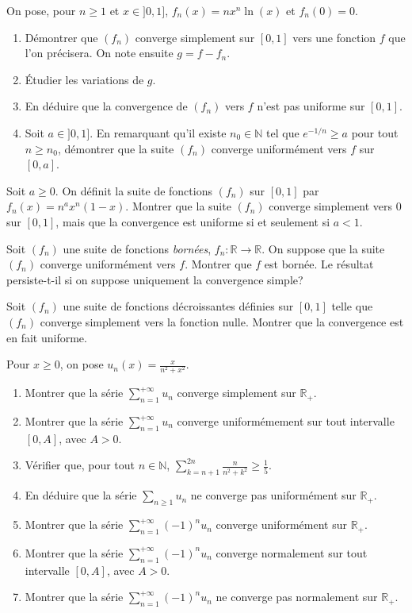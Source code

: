 \documentclass{yann}
\begin{document}
On pose, pour $n\geq 1$ et $x\in ]0,1]$, $f_n(x)=nx^n\ln(x)$ et $f_n(0)=0$.
\begin{enumerate}
\item Démontrer que $(f_n)$ converge simplement sur $[0,1]$ vers une fonction $f$ que l'on précisera. On note ensuite $g=f-f_n$.
\item \'Etudier les variations de $g$. 
\item En déduire que la convergence de $(f_n)$ vers $f$ n'est pas uniforme sur $[0,1]$.
\item Soit $a\in ]0,1]$. En remarquant qu'il existe $n_0\in\mathbb N$ tel que $e^{-1/n}\geq a$ pour tout $n\geq n_0$, démontrer que la suite $(f_n)$ converge uniformément vers $f$ sur $[0,a]$.
\end{enumerate}





Soit $a\geq 0$. On définit la suite de fonctions $(f_n)$ sur $[0,1]$ par $f_n(x)=n^a x^n(1-x)$.
Montrer que la suite $(f_n)$ converge simplement vers 0 sur $[0,1]$, mais que la convergence est uniforme si et seulement si
$a<1.$


Soit $(f_n)$ une suite de fonctions \emph{bornées}, $f_n:\mathbb R\to\mathbb R$.
On suppose que la suite $(f_n)$ converge uniformément vers $f$. Montrer que $f$ est
bornée. Le résultat persiste-t-il si on suppose uniquement la convergence simple?


Soit $(f_n)$ une suite de fonctions décroissantes définies sur $[0,1]$ telle que $(f_n)$ converge simplement vers la fonction nulle. Montrer que la convergence est en fait uniforme.




Pour $x\geq 0$, on pose $u_n(x)=\frac{x}{n^2+x^2}.$
\begin{enumerate}
\item Montrer que la série $\sum_{n=1}^{+\infty}u_n$ converge simplement sur $\mathbb R_+$.
\item  Montrer que la série $\sum_{n=1}^{+\infty}u_n$ converge uniformémement sur tout intervalle $[0,A]$,
avec $A>0$.
\item Vérifier que, pour tout $n\in\mathbb N$, $\sum_{k=n+1}^{2n}\frac{n}{n^2+k^2}\geq\frac 15$.
\item En déduire que la série $\sum_{n\geq 1}u_n$ ne converge pas uniformément sur $\mathbb R_+$.
\item Montrer que la série $\sum_{n=1}^{+\infty}(-1)^n u_n$ converge uniformément sur $\mathbb R_+$.
\item Montrer que la série $\sum_{n=1}^{+\infty}(-1)^n u_n$ converge normalement sur tout intervalle $[0,A]$,
avec $A>0$.
\item Montrer que la série $\sum_{n=1}^{+\infty}(-1)^n u_n$ ne converge pas normalement sur $\mathbb R_+$.
\end{enumerate}
\end{document}
